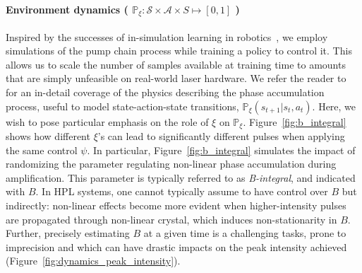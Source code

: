\paragraph{Environment dynamics ( \( \mathbb P_\xi: \mathcal S \times \mathcal A \times S \mapsto [0,1] \) ) }
Inspired by the successes of in-simulation learning in robotics~\citep{antonova2017reinforcement, akkaya2019solving, tiboni2023domain}, we employ simulations of the pump chain process while training a policy to control it. This allows us to scale the number of samples available at training time to amounts that are simply unfeasible on real-world laser hardware.
We refer the reader to~\cite{paschotta2008field} for an in-detail coverage of the physics describing the phase accumulation process, useful to model state-action-state transitions, \( \mathbb P_\xi (s_{t+1}\vert s_t, a_t) \). Here, we wish to pose particular emphasis on the role of \( \xi \) on \( \mathbb P_\xi \). Figure~\ref{fig:b_integral} shows how different \( \xi \)'s can lead to significantly different pulses when applying the same control \( \psi \). In particular, Figure~\ref{fig:b_integral} simulates the impact of randomizing the parameter regulating non-linear phase accumulation during amplification. This parameter is typically referred to as \emph{B-integral}, and indicated with \( B \). 
In HPL systems, one cannot typically assume to have control over \( B \) but indirectly: non-linear effects become more evident when higher-intensity pulses are propagated through non-linear crystal, which induces non-stationarity in \( B \). Further, precisely estimating \( B \) at a given time is a challenging tasks, prone to imprecision and which can have drastic impacts on the peak intensity achieved (Figure~\ref{fig:dynamics_peak_intensity}).


